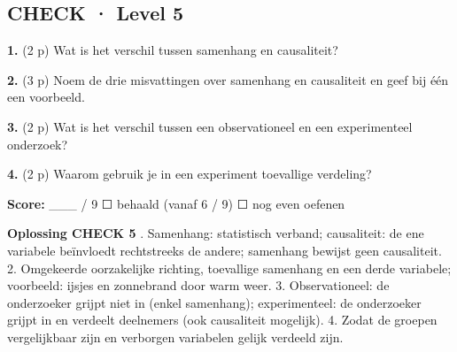\subsection*{CHECK · Level 5}

\textbf{1.} (2 p) Wat is het verschil tussen samenhang en causaliteit? \lijn

\textbf{2.} (3 p) Noem de drie misvattingen over samenhang en causaliteit en geef bij één een voorbeeld. \lijn

\textbf{3.} (2 p) Wat is het verschil tussen een observationeel en een experimenteel onderzoek? \lijn

\textbf{4.} (2 p) Waarom gebruik je in een experiment toevallige verdeling? \lijn

\begin{doel}
\textbf{Score:} \_\_\_ / 9 \quad ☐ behaald (vanaf 6 / 9) \quad ☐ nog even oefenen
\end{doel}

\begin{oplossing}
\textbf{Oplossing CHECK 5} . Samenhang: statistisch verband; causaliteit: de ene variabele beïnvloedt rechtstreeks de andere; samenhang bewijst geen causaliteit. 2. Omgekeerde oorzakelijke richting, toevallige samenhang en een derde variabele; voorbeeld: ijsjes en zonnebrand door warm weer. 3. Observationeel: de onderzoeker grijpt niet in (enkel samenhang); experimenteel: de onderzoeker grijpt in en verdeelt deelnemers (ook causaliteit mogelijk). 4. Zodat de groepen vergelijkbaar zijn en verborgen variabelen gelijk verdeeld zijn.
\end{oplossing}
